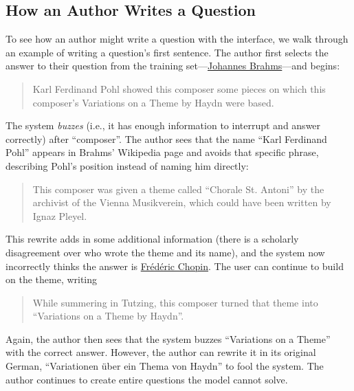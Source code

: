 \subsection{How an Author Writes a Question}

To see how an author might write a question with the interface, we walk
through an example of writing a question's first sentence. The
author first selects the answer to their question from the training
set---\underline{Johannes
Brahms}---and begins:
\begin{quote} Karl Ferdinand Pohl showed this composer some pieces on which
  this composer's Variations on a Theme by Haydn were based. \end{quote}
The  system \emph{buzzes} (i.e., it has enough information to
interrupt and answer correctly) after 
``composer''. The author sees that the name ``Karl
Ferdinand Pohl'' appears in Brahms' Wikipedia page and avoids
 that specific phrase, describing Pohl's
position instead of naming him directly:
\begin{quote} This composer was given a theme called ``Chorale St. Antoni'' by the
  archivist of the Vienna Musikverein, which could have been written
  by Ignaz Pleyel.\end{quote}
This rewrite adds in some additional information (there is a scholarly
disagreement over who wrote the theme and its name), and the  system now incorrectly thinks the answer is
\underline{Fr\'ed\'eric Chopin}.
The user can continue to build on the theme, writing \begin{quote}
   While summering in Tutzing, this composer turned that theme into
   ``Variations on a Theme by Haydn''.  \end{quote}
 Again, the author then sees that the system buzzes ``Variations on a
 Theme'' with the correct answer.  However, the author can rewrite it
 in its original German, ``Variationen \"uber ein Thema von Haydn'' to
 fool the system.
 The author continues to
create entire questions the model cannot solve.
